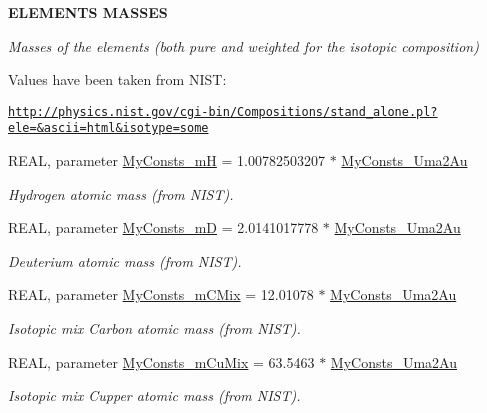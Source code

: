 \begin{Indent}{\bf ELEMENTS MASSES}\par
{\em \label{_amgrp9ee2c80ba04aa74b67659c257da42bf0}
Masses of the elements (both pure and weighted for the isotopic composition) \par
 Values have been taken from NIST:\par
 \href{http://physics.nist.gov/cgi-bin/Compositions/stand_alone.pl?ele=&ascii=html&isotype=some}{\tt http://physics.nist.gov/cgi-\/bin/Compositions/stand\_\-alone.pl?ele=\&ascii=html\&isotype=some} }\begin{DoxyCompactItemize}
\item 
REAL, parameter \hyperlink{namespace_my_consts_a6f63ce440e87b3a56e3497bfa4f8fe89}{MyConsts\_\-mH} = 1.00782503207 $\ast$ \hyperlink{namespace_my_consts_a36b4ba1dfa259ff5c9eaec55eb5f977f}{MyConsts\_\-Uma2Au}
\begin{DoxyCompactList}\small\item\em Hydrogen atomic mass (from NIST). \item\end{DoxyCompactList}\item 
REAL, parameter \hyperlink{namespace_my_consts_a1f26a10350f900a32cfaac2147965359}{MyConsts\_\-mD} = 2.0141017778 $\ast$ \hyperlink{namespace_my_consts_a36b4ba1dfa259ff5c9eaec55eb5f977f}{MyConsts\_\-Uma2Au}
\begin{DoxyCompactList}\small\item\em Deuterium atomic mass (from NIST). \item\end{DoxyCompactList}\item 
REAL, parameter \hyperlink{namespace_my_consts_a0e6de90a68dfbeb30ff2510d3a0f4f33}{MyConsts\_\-mCMix} = 12.01078 $\ast$ \hyperlink{namespace_my_consts_a36b4ba1dfa259ff5c9eaec55eb5f977f}{MyConsts\_\-Uma2Au}
\begin{DoxyCompactList}\small\item\em Isotopic mix Carbon atomic mass (from NIST). \item\end{DoxyCompactList}\item 
REAL, parameter \hyperlink{namespace_my_consts_a3e9915df2fca44d18350e2829d68c34a}{MyConsts\_\-mCuMix} = 63.5463 $\ast$ \hyperlink{namespace_my_consts_a36b4ba1dfa259ff5c9eaec55eb5f977f}{MyConsts\_\-Uma2Au}
\begin{DoxyCompactList}\small\item\em Isotopic mix Cupper atomic mass (from NIST). \item\end{DoxyCompactList}\end{DoxyCompactItemize}
\end{Indent}
